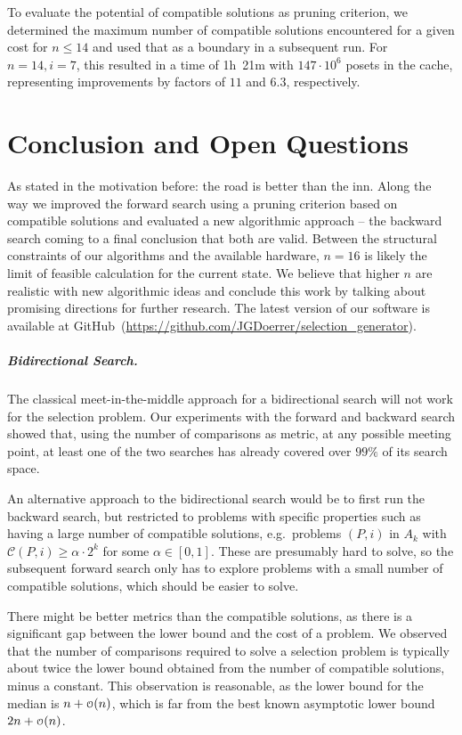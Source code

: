 \documentclass[a4paper,UKenglish,cleveref, autoref, thm-restate]{lipics-v2021}
\newcommand\smallO{
\mathchoice
{{\scriptstyle\mathcal{O}}}%
{{\scriptstyle\mathcal{O}}}%
{{\scriptscriptstyle\mathcal{O}}}%
{\scalebox{.50}{$\scriptscriptstyle\mathcal{O}$}}%
}
\newcommand{\projectURL}[0]{https://github.com/JGDoerrer/selection_generator}
\newcommand{\projectServer}[0]{GitHub}
\begin{document}
To evaluate the potential of compatible solutions as pruning criterion, we determined the maximum number of compatible solutions encountered for a given cost for $n \leq 14$ and used that as a boundary in a subsequent run.
For $n = 14, i = 7$, this resulted in a time of 1h~21m with $147 \cdot 10^6$ posets in the cache, representing improvements by factors of $11$ and $6.3$, respectively.


\section{Conclusion and Open Questions}


As stated in the motivation before: the road is better than the inn.
Along the way we improved the forward search using a pruning criterion based on compatible solutions and evaluated a new algorithmic approach -- the backward search coming to a final conclusion that both are valid.
Between the structural constraints of our algorithms and the available hardware, $n=16$ is likely the limit of feasible calculation for the current state.
We believe that higher $n$ are realistic with new algorithmic ideas and conclude this work by talking about promising directions for further research.
The latest version of our software is available at \projectServer~(\url{\projectURL}).

\subparagraph{Bidirectional Search.}
The classical meet-in-the-middle approach for a bidirectional search will not work for the selection problem.
Our experiments with the forward and backward search showed that, using the number of comparisons as metric, at any possible meeting point, at least one of the two searches has already covered over $99\%$ of its search space.

An alternative approach to the bidirectional search would be to first run the backward search, but restricted to problems with specific properties such as having a large number of compatible solutions, e.g.\ problems $(P, i)$ in $A_k$ with $\mathcal{C}(P, i) \ge \alpha \cdot 2^k$ for some $\alpha \in [0, 1]$.
These are presumably hard to solve, so the subsequent forward search only has to explore problems with a small number of compatible solutions, which should be easier to solve.

There might be better metrics than the compatible solutions, as there is a significant gap between the lower bound and the cost of a problem.
We observed that the number of comparisons required to solve a selection problem is typically about twice the lower bound obtained from the number of compatible solutions, minus a constant.
This observation is reasonable, as the lower bound for the median is $n + \smallO(n)$, which is far from the best known asymptotic lower bound $2n + \smallO(n)$.
\end{document}
